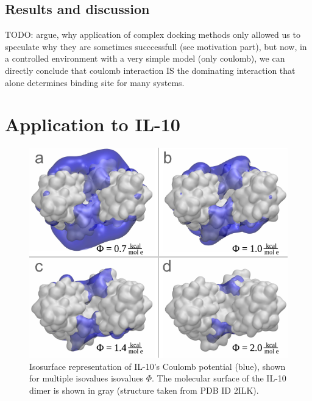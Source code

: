 \subsection{Results and discussion}

TODO: argue, why application of complex docking methods only allowed us to
speculate why they are sometimes succcessfull (see motivation part), but now,
in a controlled environment with a very simple model (only coulomb), we can
directly conclude that coulomb interaction IS the dominating interaction that
alone determines binding site for many systems.


\section{Application to IL-10}

\begin{figure}
\centering
\includegraphics[width=1.0\textwidth]{gfx/bspred/il10_top_coulomb_isosurfaces_different_values_03_ds.pdf}
\caption[]{
Isosurface representation of IL-10's Coulomb potential (blue), shown for
multiple isovalues isovalues $\Phi$. The molecular surface of the IL-10 dimer is
shown in gray (structure taken from PDB ID 2ILK).
}
\label{fig:bspred:il10_estatic_pred}
\end{figure}





